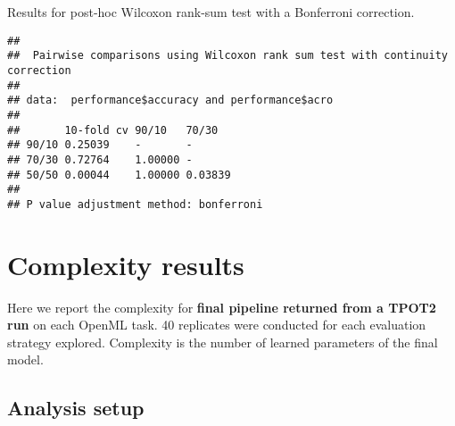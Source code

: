 \documentclass[
]{book}
\newenvironment{Shaded}{\begin{snugshade}}{\end{snugshade}}
\newcommand{\AttributeTok}[1]{\textcolor[rgb]{0.13,0.29,0.53}{#1}}
\newcommand{\ConstantTok}[1]{\textcolor[rgb]{0.56,0.35,0.01}{#1}}
\newcommand{\FunctionTok}[1]{\textcolor[rgb]{0.13,0.29,0.53}{\textbf{#1}}}
\newcommand{\NormalTok}[1]{#1}
\newcommand{\OtherTok}[1]{\textcolor[rgb]{0.56,0.35,0.01}{#1}}
\newcommand{\SpecialCharTok}[1]{\textcolor[rgb]{0.81,0.36,0.00}{\textbf{#1}}}
\newcommand{\StringTok}[1]{\textcolor[rgb]{0.31,0.60,0.02}{#1}}
\begin{document}
Results for post-hoc Wilcoxon rank-sum test with a Bonferroni correction.

\begin{Shaded}
\end{Shaded}

\begin{verbatim}
## 
##  Pairwise comparisons using Wilcoxon rank sum test with continuity correction 
## 
## data:  performance$accuracy and performance$acro 
## 
##       10-fold cv 90/10   70/30  
## 90/10 0.25039    -       -      
## 70/30 0.72764    1.00000 -      
## 50/50 0.00044    1.00000 0.03839
## 
## P value adjustment method: bonferroni
\end{verbatim}

\hypertarget{complexity-results}{%
\chapter{Complexity results}\label{complexity-results}}

Here we report the complexity for \textbf{final pipeline returned from a TPOT2 run} on each OpenML task.
40 replicates were conducted for each evaluation strategy explored.
Complexity is the number of learned parameters of the final model.

\hypertarget{analysis-setup-1}{%
\section{Analysis setup}\label{analysis-setup-1}}

\begin{Shaded}
\end{Shaded}
\end{document}
